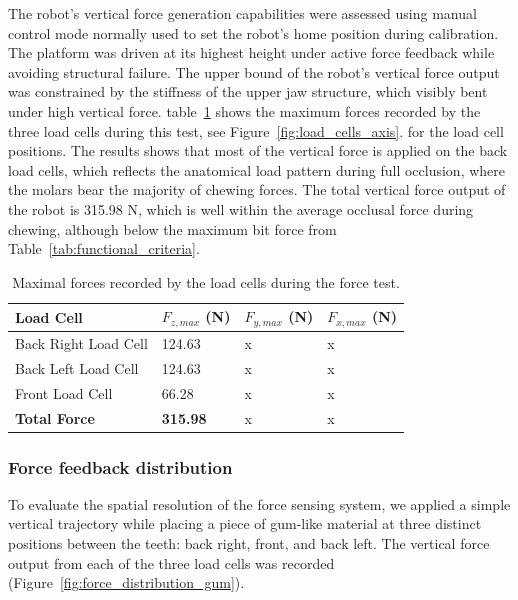 The robot's vertical force generation capabilities were assessed using manual control mode normally used to set the robot's home position during calibration. 
The platform was driven at its highest height under active force feedback while avoiding structural failure. The upper bound of the robot's vertical force 
output was constrained by the stiffness of the upper jaw structure, which visibly bent under high vertical force. table~\ref{tab:max_force} shows the 
maximum forces recorded by the three load cells during this test, see Figure~\ref{fig:load_cells_axis}.
for the load cell positions. The results shows that most of the vertical force is applied on the back load cells, which reflects the 
anatomical load pattern during full occlusion, where the molars bear the majority of chewing forces. The total vertical force output of the robot is 
315.98 N, which is well within the average occlusal force during chewing, although below the maximum bit force from Table~\ref{tab:functional_criteria}.
\begin{table}[H]
    \centering
    \begin{tabular}{p{4cm} p{2cm} p{2cm} p{2cm}}
        \toprule
        \textbf{Load Cell} & \textbf{$F_{z,max}$ (N)} & \textbf{$F_{y,max}$ (N)} & \textbf{$F_{x,max}$ (N)} \\
        \midrule
        Back Right Load Cell & 124.63 & x & x \\
        Back Left Load Cell & 124.63 & x & x  \\
        Front Load Cell & 66.28 & x & x  \\
        \midrule
        \textbf{Total Force} & \textbf{315.98} & x & x \\
        \bottomrule       
    \end{tabular}
    \caption{Maximal forces recorded by the load cells during the force test.}
    \label{tab:max_force}
\end{table}


\subsubsection{Force feedback distribution}

To evaluate the spatial resolution of the force sensing system, we applied a simple vertical trajectory while placing a piece of gum-like material 
at three distinct positions between the teeth: back right, front, and back left. The vertical force output from each of the three load cells was 
recorded (Figure~\ref{fig:force_distribution_gum}).


